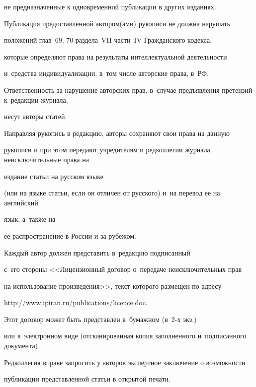{\begin{enumerate}[1.]
не предназначенные к одновременной публикации в других изданиях.







Публикация предоставленной автором(ами) рукописи не должна нарушать 


положений глав~69, 70 раздела~VII части~IV Гражданского кодекса, 


которые определяют права на результаты интеллектуальной деятельности 


и~средства индивидуализации, в~том числе авторские права, в~РФ.





Ответственность за нарушение авторских прав, в~случае предъявления претензий к~редакции журнала,  


несут авторы статей.





Направляя рукопись в редакцию, авторы сохраняют свои права на данную


рукописи и при этом передают учредителям и редколлегии журнала неисключительные права на


издание статьи на русском языке 


(или на языке статьи, если он отличен от рус\-ско\-го) и~на перевод ее на английский


язык, а~также на


ее распространение в России и за рубежом. 


Каждый автор должен представить в~редакцию подписанный 


с~его стороны <<Лицензионный договор о~передаче неисключительных прав 


на использование произведения>>, текст которого размещен по адресу 


{\sf http://www.ipiran.ru/publications/licence.doc}. 


Этот договор может быть пред\-став\-лен в~бумажном (в~2-х экз.)\ 


или в~электронном виде (отсканированная копия заполненного и~подписанного документа).








Редколлегия вправе запросить у авторов экспертное заключение о возможности


пуб\-ли\-ка\-ции пред\-став\-лен\-ной статьи в открытой печати.\\[-13.5pt]






\end{enumerate}}
